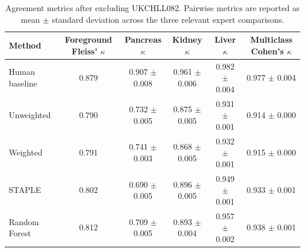 \begin{table}[h]
\centering
\small
\begin{tabular}{lccccc}
\toprule
\textbf{Method}
& \textbf{Foreground Fleiss' $\kappa$}
& \textbf{Pancreas $\kappa$}
& \textbf{Kidney $\kappa$}
& \textbf{Liver $\kappa$}
& \textbf{Multiclass Cohen's $\kappa$} \\
\midrule
Human baseline & 0.879 & 0.907 $\pm$ 0.008 & 0.961 $\pm$ 0.006 & 0.982 $\pm$ 0.004 & 0.977 $\pm$ 0.004 \\
Unweighted & 0.790 & 0.732 $\pm$ 0.005 & 0.875 $\pm$ 0.005 & 0.931 $\pm$ 0.001 & 0.914 $\pm$ 0.000 \\
Weighted & 0.791 & 0.741 $\pm$ 0.003 & 0.868 $\pm$ 0.005 & 0.932 $\pm$ 0.001 & 0.915 $\pm$ 0.000 \\
STAPLE & 0.802 & 0.690 $\pm$ 0.005 & 0.896 $\pm$ 0.005 & 0.949 $\pm$ 0.001 & 0.933 $\pm$ 0.001 \\
Random Forest & 0.812 & 0.709 $\pm$ 0.005 & 0.893 $\pm$ 0.004 & 0.957 $\pm$ 0.002 & 0.938 $\pm$ 0.001 \\
\bottomrule
\end{tabular}
\caption{Agreement metrics after excluding UKCHLL082. Pairwise metrics are reported as mean $\pm$ standard deviation across the three relevant expert comparisons.}
\label{tab:kappa_comparison_excluding_invalid_case}
\end{table}
